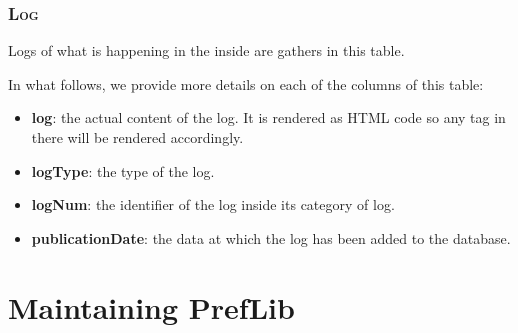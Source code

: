 \documentclass{report}
\begin{document}
	\subsection*{\faDatabase{} \textsc{Log}}
	
	Logs of what is happening in the inside are gathers in this table.
	
	In what follows, we provide more details on each of the columns of this table:
	\begin{itemize}
		\item \textbf{log}: the actual content of the log. It is rendered as HTML code so any tag in there will be rendered accordingly.
		\item \textbf{logType}: the type of the log.
		\item \textbf{logNum}: the identifier of the log inside its category of log.
		\item \textbf{publicationDate}: the data at which the log has been added to the database.
	\end{itemize}


	\chapter{Maintaining PrefLib}
	
\end{document}
